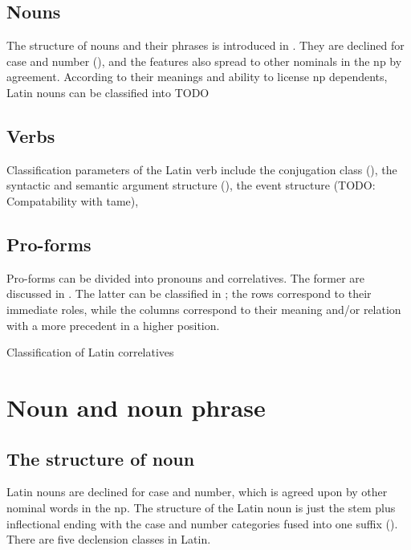 \documentclass[a4paper, oneside, 12pt]{report}
\begin{document}
\section{Nouns}

The structure of nouns and their phrases is introduced in .
They are declined for case and number (),
and the features also spread to other nominals in the \acs{np} by agreement.
According to their meanings and ability to license \acs{np} dependents, 
Latin nouns can be classified into TODO 

\section{Verbs}\label{sec:pos.verb}

Classification parameters of the Latin verb include 
the conjugation class (),
the syntactic and semantic argument structure
(), 
the event structure (TODO: Compatability with \acs{tame}),

\section{Pro-forms}

Pro-forms can be divided into pronouns and correlatives.
The former are discussed in .
The latter can be classified in ;
the rows correspond to their immediate roles,
while the columns correspond to their meaning and/or 
relation with a more precedent in a higher position.

\begin{sidewaystable}
    \centering
    \caption{Classification of Latin correlatives}
    \label{tbl:correlatives}
    {\small }
\end{sidewaystable}

\chapter{Noun and noun phrase}\label{chap:np}

\section{The structure of noun}\label{sec:np.noun}

Latin nouns are declined for case and number,
which is agreed upon by other nominal words in the \acs{np}.
The structure of the Latin noun is just
the stem plus inflectional ending 
with the case and number categories fused into one suffix
().
There are five declension classes in Latin.
\end{document}
